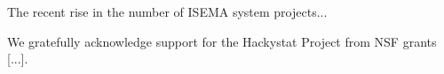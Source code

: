 \documentclass[10pt,twocolumn]{article}
\begin{document}
The recent rise in the number of ISEMA system projects...


\label{sec:acknowledgements}
We gratefully acknowledge support for the Hackystat Project from NSF grants [...].
 


\end{document}
